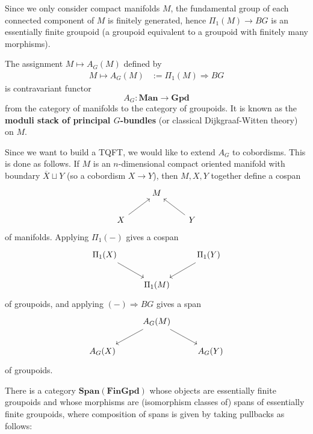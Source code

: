 \documentclass[12pt]{article}
\begin{document}
Since we only consider compact manifolds $M$, the fundamental group of each connected component of $M$ is finitely generated, hence $\Pi_1(M) \to BG$ is an essentially finite groupoid (a groupoid equivalent to a groupoid with finitely many morphisms).

\begin{definition}
The assignment $M \mapsto A_G(M)$ defined by \begin{align*}
    M \mapsto A_G(M) & := \Pi_1(M) \Rightarrow BG
\end{align*}
is contravariant functor
\begin{equation} \label{eq:AG-functor}
    A_G : \mathbf{Man} \to \mathbf{Gpd}
\end{equation}
from the category of manifolds to the category of groupoids. It is known as the \textbf{moduli stack of principal $G$-bundles} (or classical Dijkgraaf-Witten theory) on $M$.
\end{definition}
Since we want to build a TQFT, we would like to extend $A_G$ to cobordisms. This is done as follows. If $M$ is an $n$-dimensional compact oriented manifold with boundary $\overline{X} \sqcup Y$ (so a cobordism $X \to Y$), then $M,X,Y$ together define a cospan
\begin{equation} \label{eq:cospan-manifolds}
    \begin{tikzcd}
        & M & \\
        X \arrow[ur] & & Y \arrow[ul]
    \end{tikzcd}
\end{equation}
of manifolds. Applying $\Pi_1(-)$ gives a cospan
\begin{equation} \label{eq:cospan-groupoids}
    \begin{tikzcd}
        \Pi_1(X) \arrow[dr] & & \Pi_1(Y) \arrow[dl] \\
        & \Pi_1(M) &
    \end{tikzcd}
\end{equation}
of groupoids, and applying $(-)\Rightarrow BG$ gives a span
\begin{equation} \label{eq:span-groupoids}
    \begin{tikzcd}
        & A_G(M) \arrow[dl] \arrow[dr] & \\
        A_G(X) & & A_G(Y)
    \end{tikzcd}
\end{equation}
of groupoids.

There is a category $\mathbf{Span}(\mathbf{FinGpd})$ whose objects are essentially finite groupoids and whose morphisms are (isomorphism classes of) spans of essentially finite groupoids, where composition of spans is given by taking pullbacks as follows:
\end{document}

